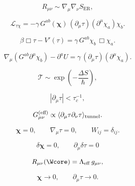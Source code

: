 \[
R_{\mu\nu} \sim \nabla_\mu\nabla_\nu S_{\mathrm{ER}},
\]

\[
\mathcal{L}_{\tau\chi}
=
-\gamma\,
G^{ab}(\bm{\chi})\, 
(\partial_\mu \tau)(\partial^\mu \chi_a)\chi_b .
\]

\[
\beta \Box \tau - V'(\tau)
=
\gamma\, G^{ab}\chi_b\,\Box\chi_a .
\]

\[
\nabla_\mu(G^{ab}\partial^\mu\chi_b)
- \partial^a U
=
\gamma\,(\partial_\mu\tau)(\partial^\mu\chi_a).
\]

\[
\mathcal{T} 
\sim 
\exp\left(-\frac{\Delta S}{\hbar}\right),
\]

\[
|\partial_\mu\tau| < \tau_c^{-1},
\]

\[
G_{\mu\nu}^{(\text{eff})}
\propto
\langle \partial_\mu \tau \partial_\nu\tau \rangle_{\rm tunnel}.
\]

\[
\bm{\chi}=0,\qquad 
\nabla_\mu \tau =0,\qquad 
W_{ij}=\delta_{ij}.
\]

\[
\delta \bm{\chi}=0,\qquad 
\partial_\mu \delta\tau =0
\]

\[
R_{\mu\nu}(\Wcore)
=
\Lambda_{\rm eff}\, g_{\mu\nu},
\]

\[
\bm{\chi}\to 0,
\qquad
\partial_\mu\tau \to 0.
\]

